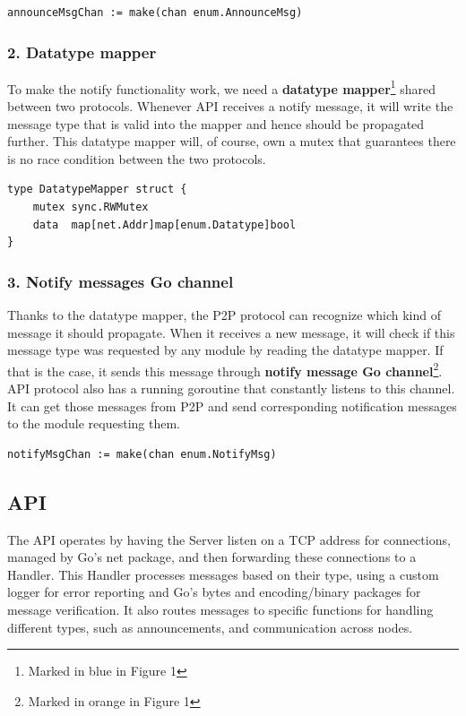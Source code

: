 \begin{lstlisting}
announceMsgChan := make(chan enum.AnnounceMsg)
\end{lstlisting}

\subsubsection{2. Datatype mapper}

To make the notify functionality work, we need a \textbf{datatype mapper}\footnote{Marked in blue in Figure 1} shared between two protocols. Whenever API receives a notify message, it will write the message type that is valid into the mapper and hence should be propagated further. This datatype mapper will, of course, own a mutex that guarantees there is no race condition between the two protocols.

\begin{lstlisting}
type DatatypeMapper struct {
    mutex sync.RWMutex
    data  map[net.Addr]map[enum.Datatype]bool
}
\end{lstlisting}

\subsubsection{3. Notify messages Go channel}

Thanks to the datatype mapper, the P2P protocol can recognize which kind of message it should propagate. When it receives a new message, it will check if this message type was requested by any module by reading the datatype mapper. If that is the case, it sends this message through \textbf{notify message Go channel}\footnote{Marked in orange in Figure 1}. API protocol also has a running goroutine that constantly listens to this channel. It can get those messages from P2P and send corresponding notification messages to the module requesting them. 

\begin{lstlisting}
notifyMsgChan := make(chan enum.NotifyMsg)
\end{lstlisting}

\subsection{API}

The API operates by having the Server listen on a TCP address for connections, managed by Go's net package, and then forwarding these connections to a Handler. This Handler processes messages based on their type, using a custom logger for error reporting and Go's bytes and encoding/binary packages for message verification. It also routes messages to specific functions for handling different types, such as announcements, and communication across nodes.

